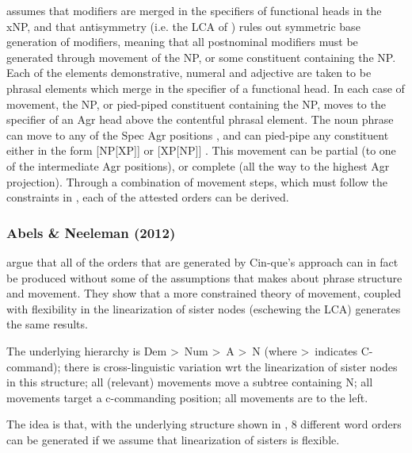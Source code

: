 \documentclass[output=paper
,modfonts
,nonflat]{langsci/langscibook}
\begin{document}
\z

\citeauthor{Cinque2005} assumes that modifiers are merged in the specifiers of functional heads in the xNP, and that antisymmetry (i.e. the LCA of \citealt{Kayne1994})  rules out symmetric base generation of modifiers, meaning that all postnominal modifiers must be generated through movement of the NP, or some constituent containing the NP. Each of the elements demonstrative, numeral and adjective are taken to be phrasal elements which merge in the specifier of a functional head. In each case of movement, the NP, or pied-piped constituent containing the NP, moves to the specifier of an Agr head above the contentful phrasal element. The noun phrase can move to any of the Spec Agr positions , and can pied-pipe any constituent either in the form [NP[XP]]  or [XP[NP]] . This movement can be partial (to one of the intermediate Agr positions), or complete (all the way to the highest Agr projection). Through a combination of movement steps, which must follow the constraints in , each of the attested orders can be derived.

\subsubsection{Abels \& Neeleman (2012)}

\citet{AbelsNeeleman2012} argue that all of the orders that are generated by Cin\hyp{}que's approach can in fact be produced without some of the assumptions that \citeauthor{Cinque2005} makes about phrase structure and movement. They show that a more constrained theory of movement, coupled with flexibility in the linearization of sister nodes (eschewing the LCA) generates the same results. 

\ea \label{ex:hall:57}
\ea The underlying hierarchy is Dem \textgreater\ Num \textgreater\ A \textgreater\ N (where \textgreater\ indicates C-command);
\ex there is cross-linguistic variation wrt the linearization of sister nodes in this structure;
\ex all (relevant) movements move a subtree containing N;
\ex all movements target a c-commanding position;
\ex all movements are to the left.
\z 
\z

The idea is that, with the underlying structure shown in , 8 different word orders can be generated if we assume that linearization of sisters is flexible.
\end{document}
